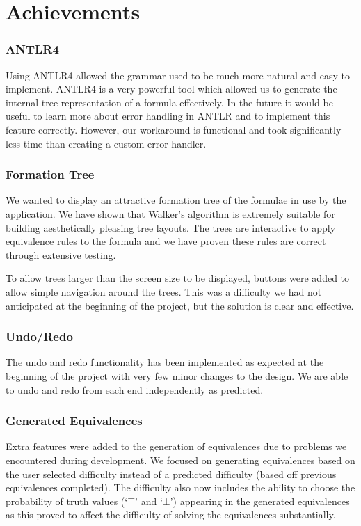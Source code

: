 \documentclass{report}
\begin{document}
\section{Achievements}

\subsubsection{ANTLR4}

Using ANTLR4 allowed the grammar used to be much more natural and easy to implement. ANTLR4 is a very powerful tool which allowed us to generate the internal tree representation of a formula effectively. In the future it would be useful to learn more about error handling in ANTLR and to implement this feature correctly. However, our workaround is functional and took significantly less time than creating a custom error handler.

\subsubsection{Formation Tree}

We wanted to display an attractive formation tree of the formulae in use by the application. We have shown that Walker's algorithm is extremely suitable for building aesthetically pleasing tree layouts. The trees are interactive to apply equivalence rules to the formula and we have proven these rules are correct through extensive testing. 

To allow trees larger than the screen size to be displayed, buttons were added to allow simple navigation around the trees. This was a difficulty we had not anticipated at the beginning of the project, but the solution is clear and effective.

\subsubsection{Undo/Redo}

The undo and redo functionality has been implemented as expected at the beginning of the project with very few minor changes to the design. We are able to undo and redo from each end independently as predicted.

\subsubsection{Generated Equivalences}

Extra features were added to the generation of equivalences due to problems we encountered during development. We focused on generating equivalences based on the user selected difficulty instead of a predicted difficulty (based off previous equivalences completed). The difficulty also now includes the ability to choose the probability of truth values (`$\top$' and `$\bot$') appearing in the generated equivalences as this proved to affect the difficulty of solving the equivalences substantially.
\end{document}
